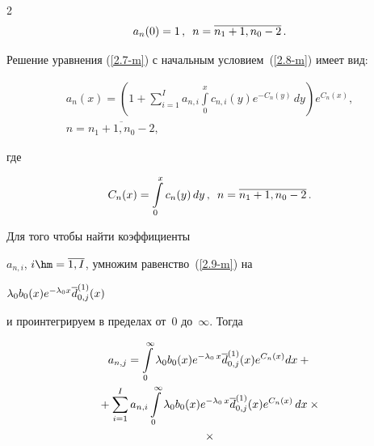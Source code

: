 \begin{multicols}{2}
\begin{equation}
\label{2.8-m}


a_n(0) = 1\,,


\enskip n=\overline{n_1+1,n_0-2}\,.


\end{equation}


Решение уравнения (\ref{2.7-m}) с начальным условием~(\ref{2.8-m}) имеет вид:


\begin{multline}


a_{n}(x) = \left(


1+ \sum\limits_{i=1}^I\! a_{n,i} \int\limits_0^x c_{n,i}(y) e^{- C_n(y)} \,dy


\right)


e^{C_n(x)} ,\\  n=\overline{n_1+1,n_0-2},


\label{2.9-m}


\end{multline}


где


\begin{equation*}




C_{n}(x) = \int\limits_0^x c_n(y)\, dy\,,


\enskip n=\overline{n_1+1,n_0-2}\,.


\end{equation*}





Для того чтобы найти коэффициенты


$a_{n,i}$, $i\hm=\overline{1,I}$, умножим равенство~(\ref{2.9-m}) на


$\lambda_0 b_0(x) e^{-\lambda_0 x} \overline d^{(1)}_{0,j}(x)$


и проинтегрируем в пределах от~0 до~$\infty$. Тогда


\begin{multline*}




a_{n,j} = \int\limits_0^\infty \lambda_0 b_0(x) e^{-\lambda_0\, x} \d^{(1)}_{0,j}(x)


e^{C_n(x)} dx + {}\\


{}+ \sum\limits_{i=1}^I a_{n,i} \int\limits_0^\infty \lambda_0 b_0(x) e^{-\lambda_0\, x} 


\d^{(1)}_{0,j}(x) e^{C_n(x)} \,dx\times{}\\


{}\times



\end{multline*}
\end{multicols}
